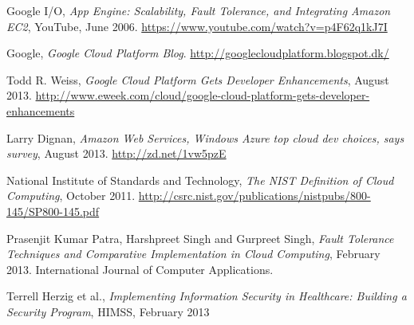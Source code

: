 \documentclass[11pt]{report}
\begin{document}
\begin{thebibliography}{99}
	Google I/O, \emph{App Engine: Scalability, Fault Tolerance, and Integrating Amazon EC2}, YouTube, June 2006.
	\url{https://www.youtube.com/watch?v=p4F62q1kJ7I}
	
	Google, \emph{Google Cloud Platform Blog}.
	\url{http://googlecloudplatform.blogspot.dk/}
	
	Todd R. Weiss, \emph{Google Cloud Platform Gets Developer Enhancements}, August 2013.
	\url{http://www.eweek.com/cloud/google-cloud-platform-gets-developer-enhancements}
	
	Larry Dignan, \emph{Amazon Web Services, Windows Azure top cloud dev choices, says survey}, August 2013.
	\url{http://zd.net/1vw5pzE}
	
	National Institute of Standards and Technology, \emph{The NIST Definition of Cloud Computing}, October 2011.
	\url{http://csrc.nist.gov/publications/nistpubs/800-145/SP800-145.pdf}
	
	Prasenjit Kumar Patra, Harshpreet Singh and Gurpreet Singh, \emph{Fault Tolerance Techniques and Comparative Implementation in Cloud Computing}, February 2013.
	International Journal of Computer Applications.
	
	Terrell Herzig et al., \emph{Implementing Information Security in Healthcare: Building a Security Program}, HIMSS, February 2013

\end{thebibliography}
\end{document}
